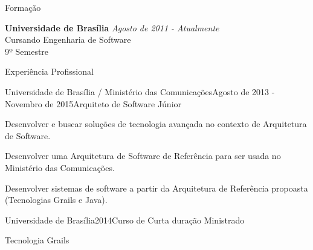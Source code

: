 \documentclass{resume} %
\begin{document}

\begin{rSection}{Formação}

{\bf Universidade de Brasília} \hfill {\em Agosto de 2011 - Atualmente} \\ 
Cursando Engenharia de Software \\
9º Semestre \\

\end{rSection}


\begin{rSection}{Experiência Profissional}

\begin{rSubsection}{Universidade de Brasília / Ministério das Comunicações}{Agosto de 2013 - Novembro de 2015}{Arquiteto de Software Júnior}{}
\item Desenvolver e buscar soluções de tecnologia avançada no contexto de Arquitetura de
Software.
\item Desenvolver uma Arquitetura de Software de Referência para ser usada no Ministério
das Comunicações.
\item Desenvolver sistemas de software a partir da Arquitetura de Referência propoasta (Tecnologias Grails e Java).
\end{rSubsection}


\begin{rSubsection}{Universidade de Brasília}{2014}{Curso de Curta duração Ministrado}{}
\item Tecnologia Grails
\end{rSubsection}

\end{rSection}

\end{document}
